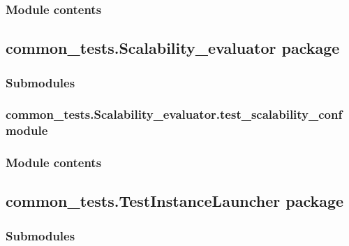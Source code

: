 \documentclass[letterpaper,10pt,english]{sphinxmanual}
\begin{document}
\subsubsection{Module contents}
\label{\detokenize{common_tests.PerformanceDatastructs:module-common_tests.PerformanceDatastructs}}\label{\detokenize{common_tests.PerformanceDatastructs:module-contents}}

\subsection{common\_tests.Scalability\_evaluator package}
\label{\detokenize{common_tests.Scalability_evaluator:common-tests-scalability-evaluator-package}}\label{\detokenize{common_tests.Scalability_evaluator::doc}}

\subsubsection{Submodules}
\label{\detokenize{common_tests.Scalability_evaluator:submodules}}

\subsubsection{common\_tests.Scalability\_evaluator.test\_scalability\_conf module}
\label{\detokenize{common_tests.Scalability_evaluator:common-tests-scalability-evaluator-test-scalability-conf-module}}

\subsubsection{Module contents}
\label{\detokenize{common_tests.Scalability_evaluator:module-common_tests.Scalability_evaluator}}\label{\detokenize{common_tests.Scalability_evaluator:module-contents}}

\subsection{common\_tests.TestInstanceLauncher package}
\label{\detokenize{common_tests.TestInstanceLauncher:common-tests-testinstancelauncher-package}}\label{\detokenize{common_tests.TestInstanceLauncher::doc}}

\subsubsection{Submodules}
\label{\detokenize{common_tests.TestInstanceLauncher:submodules}}
\end{document}
